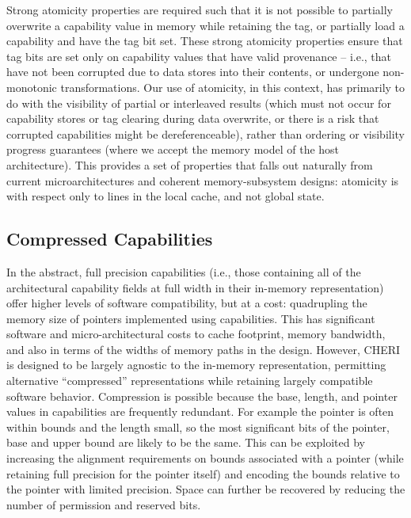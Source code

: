 Strong atomicity properties are required such that it is not possible to
partially overwrite a capability value in memory while retaining the tag, or
partially load a capability and have the tag bit set.
These strong atomicity properties ensure that tag bits are set only on
capability values that have valid provenance -- i.e., that have not been
corrupted due to data stores into their contents, or undergone non-monotonic
transformations.
Our use of atomicity, in this context, has primarily to do with the visibility
of partial or interleaved results (which must not occur for capability stores
or tag clearing during data overwrite, or there is a risk that corrupted
capabilities might be dereferenceable), rather than ordering or visibility
progress guarantees (where we accept the memory model of the host
architecture).
This provides a set of properties that falls out naturally from current
microarchitectures and coherent memory-subsystem designs: atomicity is with
respect only to lines in the local cache, and not global state.

\subsection{Compressed Capabilities}
\label{compression}

In the abstract, full precision capabilities (i.e., those containing all of
the architectural capability fields at full width in their in-memory
representation) offer higher levels of software compatibility, but at a cost:
quadrupling the memory size of pointers implemented using capabilities.
This has significant software and micro-architectural costs to cache
footprint, memory bandwidth, and also in terms of the widths of memory paths
in the design.
However, CHERI is designed to be largely agnostic to the in-memory
representation, permitting alternative ``compressed'' representations while
retaining largely compatible software behavior.
Compression is possible because the base, length, and pointer values in
capabilities are frequently redundant. For example the pointer is often
within bounds and the length small, so the most significant bits of the pointer,
base and upper bound are likely to be the same.
This can be exploited by increasing
the alignment requirements on bounds associated with a pointer (while
retaining full precision for the pointer itself) and encoding the bounds relative
to the pointer with limited precision.
Space can further be recovered by reducing the number of permission and reserved bits.

